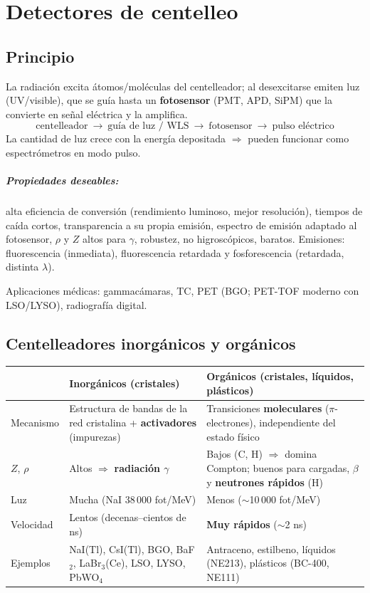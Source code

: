 \chapter{Detectores de centelleo}

\section{Principio}
\begin{clave}
La radiación excita átomos/moléculas del centelleador; al desexcitarse emiten luz (UV/visible), que se
guía hasta un \textbf{fotosensor} (PMT, APD, SiPM) que la convierte en señal eléctrica y la amplifica.
\[ \text{centelleador}\ \to\ \text{guía de luz / WLS}\ \to\ \text{fotosensor}\ \to\ \text{pulso eléctrico} \]
La cantidad de luz crece con la energía depositada $\Rightarrow$ pueden funcionar como espectrómetros en modo pulso.
\end{clave}

\paragraph{Propiedades deseables:} alta eficiencia de conversión (rendimiento luminoso, mejor resolución), tiempos de caída cortos,
transparencia a su propia emisión, espectro de emisión adaptado al fotosensor, $\rho$ y $Z$ altos para $\gamma$, robustez,
no higroscópicos, baratos. Emisiones: fluorescencia (inmediata), fluorescencia retardada y fosforescencia (retardada, distinta $\lambda$).

Aplicaciones médicas: gammacámaras, TC, PET (BGO; PET-TOF moderno con LSO/LYSO), radiografía digital.

\section{Centelleadores inorgánicos y orgánicos}
\begin{clave}
\begin{center}\small
\begin{tabularx}{\linewidth}{lXX}
\toprule
& \textbf{Inorgánicos} (cristales) & \textbf{Orgánicos} (cristales, líquidos, plásticos)\\
\midrule
Mecanismo & Estructura de bandas de la red cristalina + \textbf{activadores} (impurezas) & Transiciones \textbf{moleculares} ($\pi$-electrones), independiente del estado físico\\
$Z$, $\rho$ & Altos $\Rightarrow$ \textbf{radiación $\gamma$} & Bajos (C, H) $\Rightarrow$ domina Compton; buenos para cargadas, $\beta$ y \textbf{neutrones rápidos} (H)\\
Luz & Mucha (NaI 38\,000 fot/MeV) & Menos ($\sim$10\,000 fot/MeV)\\
Velocidad & Lentos (decenas--cientos de ns) & \textbf{Muy rápidos} ($\sim$2 ns)\\
Ejemplos & NaI(Tl), CsI(Tl), BGO, BaF$_2$, LaBr$_3$(Ce), LSO, LYSO, PbWO$_4$ & Antraceno, estilbeno, líquidos (NE213), plásticos (BC-400, NE111)\\
\bottomrule
\end{tabularx}
\end{center}
\end{clave}

